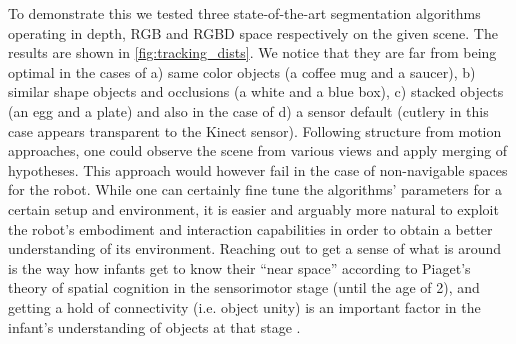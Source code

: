To demonstrate this we tested three state-of-the-art segmentation algorithms operating in depth, RGB and RGBD
space respectively on the given scene. The results are shown in \ref{fig:tracking_dists}. We notice that they are far
from being optimal in the cases of a) same color objects (a coffee mug and a saucer), 
b) similar shape objects and occlusions (a white and a blue box), c) stacked objects (an egg and a plate)
and also in the case of d) a sensor
default (cutlery in this case appears transparent to the Kinect sensor). Following structure from motion
approaches, one could observe the scene from various views and apply merging of hypotheses.
This approach would however fail in the case of non-navigable spaces for the robot.
While one can certainly fine tune the algorithms' parameters for a certain setup and 
environment, it is easier and arguably more natural to exploit the robot's embodiment
and interaction capabilities in order to obtain a better understanding of its environment.
Reaching out to get a sense of what is around is the way how infants get to know their
``near space'' according to Piaget's theory of spatial cognition in the sensorimotor stage 
(until the age of 2), and getting a hold of connectivity (i.e. object unity) is an important
factor in the infant's understanding of objects at that stage \cite{infants}.

